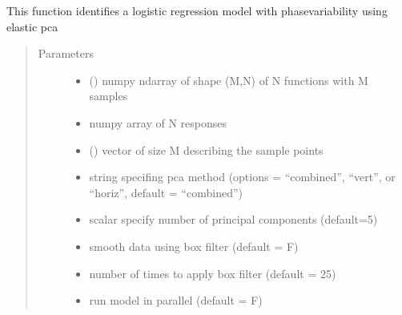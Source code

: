 \documentclass[letterpaper,10pt,english]{sphinxmanual}
\begin{document}
\begin{fulllineitems}
\begin{fulllineitems}
\label{\detokenize{pcr_regression:pcr_regression.elastic_mlpcr_regression.calc_model}}
This function identifies a logistic regression model with phase\sphinxhyphen{}variability
using elastic pca
\begin{quote}\begin{description}
\item[{Parameters}] \leavevmode\begin{itemize}
\item {} 
 () \textendash{} numpy ndarray of shape (M,N) of N functions with M samples

\item {} 
 \textendash{} numpy array of N responses

\item {} 
 () \textendash{} vector of size M describing the sample points

\item {} 
 \textendash{} string specifing pca method (options = “combined”,
“vert”, or “horiz”, default = “combined”)

\item {} 
 \textendash{} scalar specify number of principal components (default=5)

\item {} 
 \textendash{} smooth data using box filter (default = F)

\item {} 
 \textendash{} number of times to apply box filter (default = 25)

\item {} 
 \textendash{} run model in parallel (default = F)

\end{itemize}

\end{description}\end{quote}


\end{fulllineitems}
\end{fulllineitems}
\end{document}
